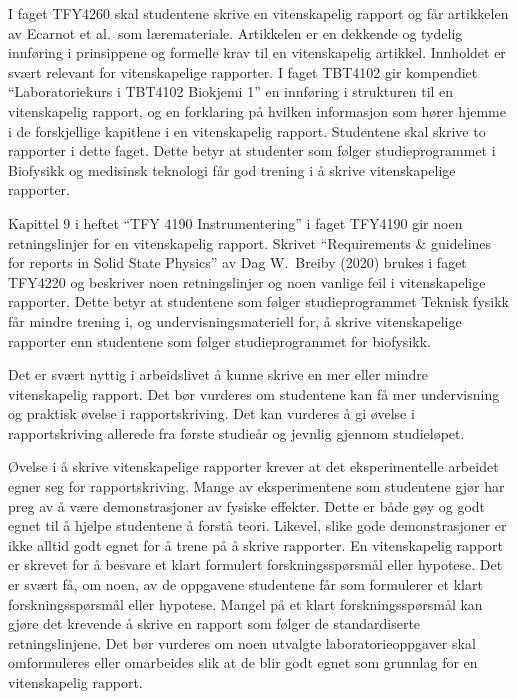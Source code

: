 \documentclass{article}
\begin{document}
I faget TFY4260 skal studentene skrive en vitenskapelig rapport og får artikkelen av Ecarnot et al.~som læremateriale. Artikkelen er en dekkende og tydelig innføring i prinsippene og formelle krav til en vitenskapelig artikkel. Innholdet er svært relevant for vitenskapelige rapporter. I faget TBT4102 gir kompendiet ``Laboratoriekurs i TBT4102 Biokjemi 1'' en innføring i strukturen til en vitenskapelig rapport, og en forklaring på hvilken informasjon som hører hjemme i de forskjellige kapitlene i en vitenskapelig rapport. Studentene skal skrive to rapporter i dette faget. Dette betyr at studenter som følger studieprogrammet i Biofysikk og medisinsk teknologi får god trening i å skrive vitenskapelige rapporter.

Kapittel 9 i heftet ``TFY 4190 Instrumentering'' i faget TFY4190 gir noen retningslinjer for en vitenskapelig rapport. Skrivet ``Requirements \& guidelines for reports in Solid State Physics'' av Dag W.~Breiby (2020) brukes i faget TFY4220 og beskriver noen retningslinjer og noen vanlige feil i vitenskapelige rapporter. Dette betyr at studentene som følger studieprogrammet Teknisk fysikk får mindre trening i, og undervisningsmateriell for, å skrive vitenskapelige rapporter enn studentene som følger studieprogrammet for biofysikk.

Det er svært nyttig i arbeidslivet å kunne skrive en mer eller mindre vitenskapelig rapport.
Det bør vurderes om studentene kan få mer undervisning og praktisk øvelse i rapportskriving. Det kan vurderes å gi øvelse i rapportskriving allerede fra første studieår og jevnlig gjennom studieløpet.

Øvelse i å skrive vitenskapelige rapporter krever at det eksperimentelle arbeidet egner seg for rapportskriving. Mange av eksperimentene som studentene gjør har preg av å være demonstrasjoner av fysiske effekter. Dette er både gøy og godt egnet til å hjelpe studentene å forstå teori. Likevel, slike gode demonstrasjoner er ikke alltid godt egnet for å trene på å skrive rapporter. En vitenskapelig rapport er skrevet for å besvare et klart formulert forskningsspørsmål eller hypotese. Det er svært få, om noen, av de oppgavene studentene får som formulerer et klart forskningsspørsmål eller hypotese. Mangel på et klart forskningsspørsmål kan gjøre det krevende å skrive en rapport som følger de standardiserte retningslinjene. Det bør vurderes om noen utvalgte laboratorieoppgaver skal omformuleres eller omarbeides slik at de blir godt egnet som grunnlag for en vitenskapelig rapport.
\end{document}
